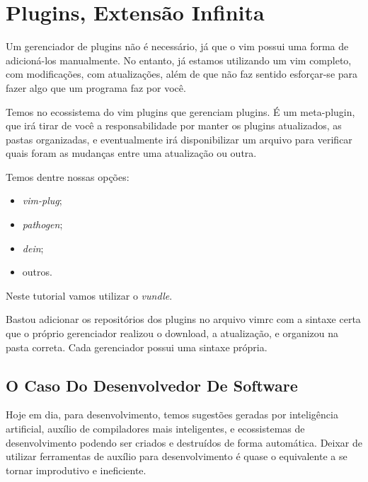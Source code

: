 \chapter{Plugins, Extensão Infinita}
Um gerenciador de plugins não é necessário, já que o vim possui uma forma de adicioná-los manualmente.
No entanto, já estamos utilizando um vim completo, com modificações, com atualizações,
além de que não faz sentido esforçar-se para fazer algo que um programa faz por você.


Temos no ecossistema do vim plugins que gerenciam plugins.
É um meta-plugin, que irá tirar de você a responsabilidade por manter os plugins atualizados,
as pastas organizadas, e eventualmente irá disponibilizar um arquivo para verificar quais foram
as mudanças entre uma atualização ou outra.

\vspace{1.2cm}
Temos dentre nossas opções:
\begin{multicols}{2}
\begin{itemize}
	\item \emph{vim-plug};
	\item \emph{pathogen};
	\item \emph{dein};
	\item outros.
\end{itemize}
\end{multicols}
Neste tutorial vamos utilizar o \emph{vundle}.


Bastou adicionar os repositórios dos plugins no arquivo vimrc com a sintaxe certa que o próprio gerenciador
realizou o download, a atualização, e organizou na pasta correta.
Cada gerenciador possui uma sintaxe própria.

\section{O Caso Do Desenvolvedor De Software}
Hoje em dia, para desenvolvimento, temos sugestões geradas por inteligência artificial,
auxílio de compiladores mais inteligentes,
e ecossistemas de desenvolvimento podendo ser criados e destruídos de forma automática.
Deixar de utilizar ferramentas de auxílio para desenvolvimento é quase o equivalente a se tornar
improdutivo e ineficiente.

